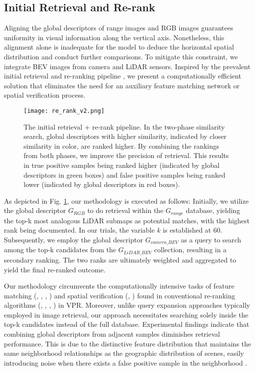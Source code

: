 \subsection{Initial Retrieval and Re-rank}
Aligning the global descriptors of range images and RGB images guarantees uniformity in visual information along the vertical axis. Nonetheless, this alignment alone is inadequate for the model to deduce the horizontal spatial distribution and conduct further comparisons. To mitigate this constraint, we integrate BEV images from camera and LiDAR sensors. Inspired by the prevalent initial retrieval and re-ranking pipeline \cite{shao2023global}, we present a computationally efficient solution that eliminates the need for an auxiliary feature matching network or spatial verification process.
\begin{figure}[]
    \centering
    \texttt{[image: re\_rank\_v2.png]}
    \caption{The initial retrieval + re-rank pipeline. In the two-phase similarity search, global descriptors with higher similarity, indicated by closer similarity in color, are ranked higher. By combining the rankings from both phases, we improve the precision of retrieval. This results in true positive samples being ranked higher (indicated by global descriptors in green boxes) and false positive samples being ranked lower (indicated by global descriptors in red boxes).}
    \label{fig:rerank}
\end{figure}
As depicted in Fig. \ref{fig:rerank}, our methodology is executed as follows: Initially, we utilize the global descriptor $G_{RGB}$ to do retrieval within the $G_{range}$ database, yielding the top-k most analogous LiDAR submaps as potential matches, with the highest rank being documented. In our trials, the variable $k$ is established at 60. Subsequently, we employ the global descriptor $G_{camera\_BEV}$ as a query to search among the top-k candidates from the $G_{LiDAR\_BEV}$ collection, resulting in a secondary ranking. The two ranks are ultimately weighted and aggregated to yield the final re-ranked outcome.

Our methodology circumvents the computationally intensive tasks of feature matching (\cite{sarlin2020superglue}, \cite{sun2021loftr}, \cite{lindenberger2023lightglue}, \cite{wang2024efficient}) and spatial verification (\cite{lee2022correlation}, \cite{xue2022efficient}) found in conventional re-ranking algorithms (\cite{wang2022transvpr}, \cite{zhang2023etr}, \cite{zhu2023r2former}, \cite{hausler2021patch}) in VPR. Moreover, unlike query expansion \cite{radenovic2018fine} approaches typically employed in image retrieval, our approach necessitates searching solely inside the top-k candidates instead of the full database. Experimental findings indicate that combining global descriptors from adjacent samples diminishes retrieval performance. This is due to the distinctive feature distribution that maintains the same neighborhood relationships \cite{luo2023bevplace} as the geographic distribution of scenes, easily introducing noise when there exists a false positive sample in the neighborhood \cite{zaffar2024estimation}.